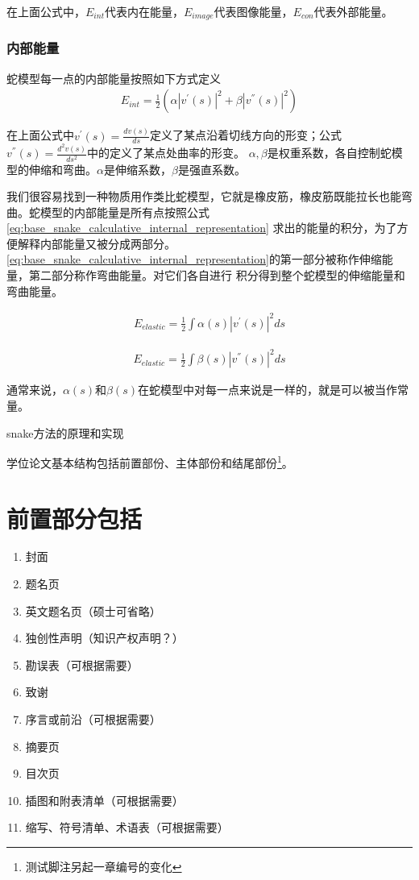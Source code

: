 在上面公式中，$E_{int}$代表内在能量，$E_{image}$代表图像能量，$E_{con}$代表外部能量。

\subsubsection{内部能量}
蛇模型每一点的内部能量按照如下方式定义
\begin{align}\label{eq:base_snake_calculative_internal_representation}
	E_{int} = \frac{1}{2}(\alpha|v^{'}(s)|^{2}+\beta|v^{''}(s)|^{2})
\end{align}

在上面公式中$v^{'}(s)=\frac{dv(s)}{ds}$定义了某点沿着切线方向的形变；公式$v^{''}(s)=\frac{d^{2}v(s)}{ds^{2}}$中的定义了某点处曲率的形变。
$\alpha,\beta$是权重系数，各自控制蛇模型的伸缩和弯曲。$\alpha$是伸缩系数，$\beta$是强直系数。


我们很容易找到一种物质用作类比蛇模型，它就是橡皮筋，橡皮筋既能拉长也能弯曲。蛇模型的内部能量是所有点按照公式\eqref{eq:base_snake_calculative_internal_representation}
求出的能量的积分，为了方便解释内部能量又被分成两部分。\eqref{eq:base_snake_calculative_internal_representation}的第一部分被称作伸缩能量，第二部分称作弯曲能量。对它们各自进行
积分得到整个蛇模型的伸缩能量和弯曲能量。

\begin{align}\label{eq:base_snake_calculative_internal_elastic_representation}
	E_{elastic} = \frac{1}{2}\int\alpha(s)|v^{'}(s)|^{2}ds
\end{align}

\begin{align}\label{eq:base_snake_calculative_internal_bending_representation}
	E_{elastic} = \frac{1}{2}\int\beta(s)|v^{''}(s)|^{2}ds
\end{align}

通常来说，$\alpha(s)$和$\beta(s)$在蛇模型中对每一点来说是一样的，就是可以被当作常量。


snake方法的原理和实现

学位论文基本结构包括前置部份、主体部份和结尾部份\footnote{测试脚注另起一章编号的变化}。
\section{前置部分包括}
\begin{enumerate}
	\item 封面
	\item 题名页
	\item 英文题名页（硕士可省略）
	\item 独创性声明（知识产权声明？）
	\item 勘误表（可根据需要）
	\item 致谢
	\item 序言或前沿（可根据需要）
	\item 摘要页
	\item 目次页
	\item 插图和附表清单（可根据需要）
	\item 缩写、符号清单、术语表（可根据需要）
\end{enumerate}
